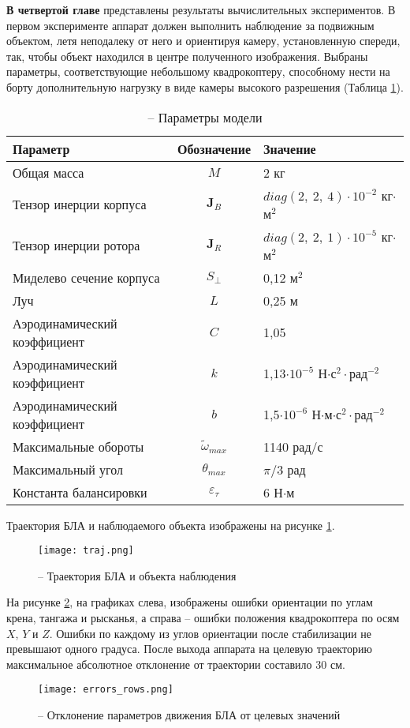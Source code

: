\textbf{В четвертой главе} представлены результаты вычислительных экспериментов. 
В первом эксперименте аппарат должен выполнить наблюдение за подвижным объектом, летя неподалеку от него и ориентируя камеру, установленную спереди, так, чтобы объект находился в центре полученного изображения. Выбраны параметры, соответствующие небольшому квадрокоптеру, способному нести на борту дополнительную нагрузку в виде камеры высокого разрешения (Таблица \ref{tb:params_table}).
\begin{table}[h!]
	\centering
	\caption{ -- Параметры модели}\label{tb:params_table} 
	\begin{tabular}{lcl}
		\hline
		Параметр & Обозначение & Значение  \\\hline
		Общая масса & $M$ & 2 кг  \\
		Тензор инерции корпуса & $\bm J_B$ & $diag(2,\ 2,\ 4)\cdot{10^{-2}}$ кг$\cdot$м$^2$  \\
		Тензор инерции ротора & $\bm J_R$ & $diag(2,\ 2,\ 1)\cdot{10^{-5}}$ кг$\cdot$м$^2$  \\
		Миделево сечение корпуса & $S_{\perp}$ & 0,12 м$^2$ \\
		Луч & $L$ & 0,25 м \\
		Аэродинамический коэффициент & $C$ & 1,05\\
		Аэродинамический коэффициент & $k$ & 1,13$\cdot 10^{-5}$ Н$\cdot$с$^2\cdot$рад$^{-2}$ \\		
		Аэродинамический коэффициент & $b$ & 1,5$\cdot 10^{-6}$ Н$\cdot$м$\cdot$с$^2\cdot$рад$^{-2}$ \\		
		Максимальные обороты & $\tilde \omega_{max}$ & 1140 рад/с \\		
		Максимальный угол & $\theta_{max}$ & ${\pi}/{3}$ рад \\
		Константа балансировки & $\varepsilon_\tau$ &6 Н$\cdot$м \\
		\hline
	\end{tabular}
\end{table}
Траектория БЛА и наблюдаемого объекта изображены на рисунке \ref{fig:mau_traj}.
\begin{figure}[H]
	\centering
	\texttt{[image: traj.png]}
	\caption{ -- Траектория БЛА и объекта наблюдения}
	\label{fig:mau_traj}
\end{figure}

На рисунке \ref{fig:mau_errors}, на графиках слева, изображены ошибки ориентации по углам крена, тангажа и рысканья,
а справа -- ошибки положения  квадрокоптера по осям $X$, $Y$ и $Z$.
Ошибки по каждому из углов ориентации после стабилизации не превышают одного градуса.
После выхода аппарата на целевую траекторию максимальное абсолютное отклонение от траектории составило 30 см.
\begin{figure}[H]
	\centering
	\texttt{[image: errors\_rows.png]}
	\caption{ -- Отклонение параметров движения БЛА от целевых значений}
	\label{fig:mau_errors}
\end{figure}

